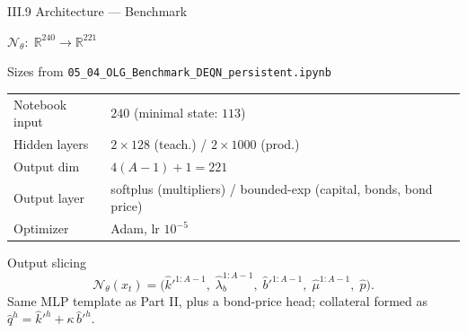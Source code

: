 \documentclass[aspectratio=169,11pt]{beamer}
\newcommand{\R}{\mathbb{R}}
\newcommand{\N}{\mathcal{N}}
\begin{document}
\begin{frame}{III.9 Architecture --- Benchmark}
\scriptsize
\begin{center}
$\N_\theta:\;\R^{240} \to \R^{221}$
\end{center}
\vspace{-4pt}

\begin{block}{Sizes from \texttt{05\_04\_OLG\_Benchmark\_DEQN\_persistent.ipynb}}
\centering
\begin{tabular}{ll}
\toprule
Notebook input   & $240$ (minimal state: $113$) \\
Hidden layers    & $2{\times}128$ (teach.) / $2{\times}1000$ (prod.) \\
Output dim       & $4(A{-}1) + 1 = 221$ \\
Output layer     & softplus (multipliers) / bounded-exp (capital, bonds, bond price) \\
Optimizer        & Adam, lr $10^{-5}$\\
\bottomrule
\end{tabular}
\end{block}

\vspace{-3pt}
\begin{exampleblock}{Output slicing}
\vspace{-6pt}
\[
\N_\theta(x_t)
=
\bigl(\hat k'^{1:A-1},\;\hat\lambda_b^{1:A-1},\;\hat b'^{1:A-1},\;\hat\mu^{1:A-1},\;\hat p\bigr).
\]
\vspace{-4pt}
Same MLP template as Part II, plus a bond-price head; collateral formed as $\hat q^h=\hat k'^h+\kappa\,\hat b'^h$.
\end{exampleblock}
\end{frame}
\end{document}
